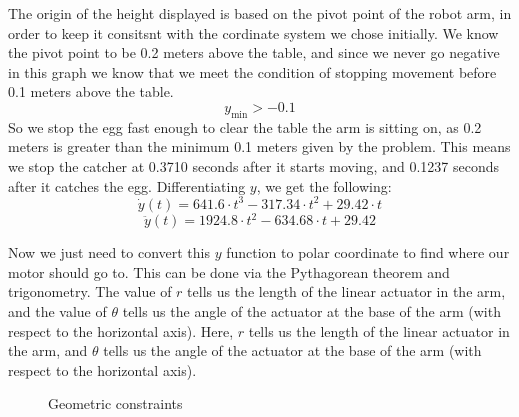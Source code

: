 \documentclass[nofoot,pdf-a,balance,colorlinks,upint,subscriptcorrection,varvw,mathalfa=cal=boondoxo]{asmeconf}
\begin{document}
	The origin of the height displayed is based on the pivot point of the robot arm, in order to keep it consitsnt with the cordinate system we chose initially. We know the pivot point to be 0.2 meters above the table, and since we never go negative in this graph we know that we meet the condition of stopping movement before 0.1 meters above the table.
	\begin{equation}
	y_{\textrm{min}} > -0.1
	\end{equation}
	So we stop the egg fast enough to clear the table the arm is sitting on, as 0.2 meters is greater than the minimum 0.1 meters given by the problem. This means we stop the catcher at 0.3710 seconds after it starts moving, and 0.1237 seconds after it catches the egg.\newline
    Differentiating $y$, we get the following:
    \begin{equation}\label{y_velocity}
        \dot{y}\left(t\right) = 641.6 \cdot t^3 - 317.34 \cdot t^2 + 29.42 \cdot t
    \end{equation}
    \begin{equation}\label{y_acceleration}
        \ddot{y}\left(t\right) = 1924.8 \cdot t^2 - 634.68 \cdot t + 29.42
    \end{equation}


	Now we just need to convert this $y$ function to polar coordinate to find where our motor should go to. This can be done via the Pythagorean theorem and trigonometry. The value of $r$ tells us the length of the linear actuator in the arm, and the value of $\theta$ tells us the angle of the actuator at the base of the arm (with respect to the horizontal axis). Here, $r$ tells us the length of the linear actuator in the arm, and $\theta$ tells us the angle of the actuator at the base of the arm (with respect to the horizontal axis). 

    \begin{figure}[H]
        \centering
        \caption{Geometric constraints}
    \end{figure}
\end{document}
